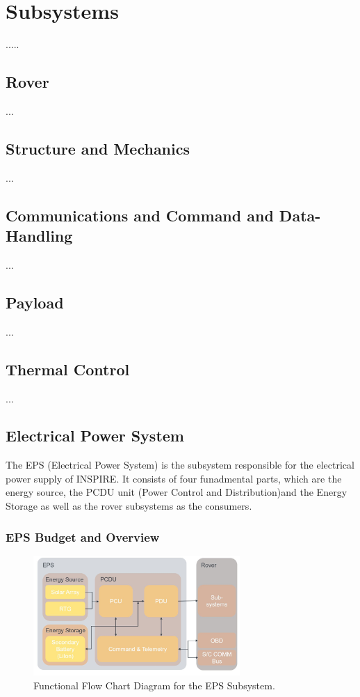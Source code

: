 \chapter{Subsystems}
\label{chap:subsystems}
.....



\section{Rover}
\label{sec:rover}
...
\section{Structure and Mechanics}
\label{sec:mechanics}
...
\section{Communications and Command and Data-Handling}
\label{sec:comm}
...
\section{Payload}
\label{sec:payload}
...
\section{Thermal Control}
\label{sec:thermalcontrol}
...
\section{Electrical Power System}
\label{sec:EPS}
The EPS (Electrical Power System) is the subsystem responsible for the electrical power supply of INSPIRE. It consists of four funadmental parts, which are the energy source, the PCDU unit (Power Control and Distribution)and the Energy Storage as well as the rover subsystems as the consumers.

\subsection{EPS Budget and Overview}

\begin{figure}[htb]
{\centering
\includegraphics[width=0.7\textwidth]{Media/epsflowchart}
\caption{Functional Flow Chart Diagram for the EPS Subsystem.}
\label{fig:epsflowchart}
}
\end{figure}

